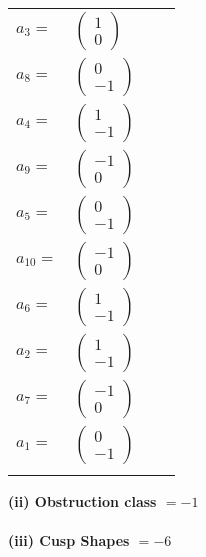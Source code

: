 \documentclass[1p]{elsarticle_modified}
\theoremstyle{definition}
\begin{document}
\begin{tabular}{m{7pt} m{180pt} m{7pt} m{180pt} }
\flushright $a_{3}=$&$\begin{pmatrix}1\\0\end{pmatrix}$ \\
\flushright $a_{8}=$&$\begin{pmatrix}0\\-1\end{pmatrix}$ \\
\flushright $a_{4}=$&$\begin{pmatrix}1\\-1\end{pmatrix}$ \\
\flushright $a_{9}=$&$\begin{pmatrix}-1\\0\end{pmatrix}$ \\
\flushright $a_{5}=$&$\begin{pmatrix}0\\-1\end{pmatrix}$ \\
\flushright $a_{10}=$&$\begin{pmatrix}-1\\0\end{pmatrix}$ \\
\flushright $a_{6}=$&$\begin{pmatrix}1\\-1\end{pmatrix}$ \\
\flushright $a_{2}=$&$\begin{pmatrix}1\\-1\end{pmatrix}$ \\
\flushright $a_{7}=$&$\begin{pmatrix}-1\\0\end{pmatrix}$ \\
\flushright $a_{1}=$&$\begin{pmatrix}0\\-1\end{pmatrix}$\\&\end{tabular}
\flushleft \textbf{(ii) Obstruction class $= -1$}\\~\\
\flushleft \textbf{(iii) Cusp Shapes $= -6$}\\~\\
\end{document}
